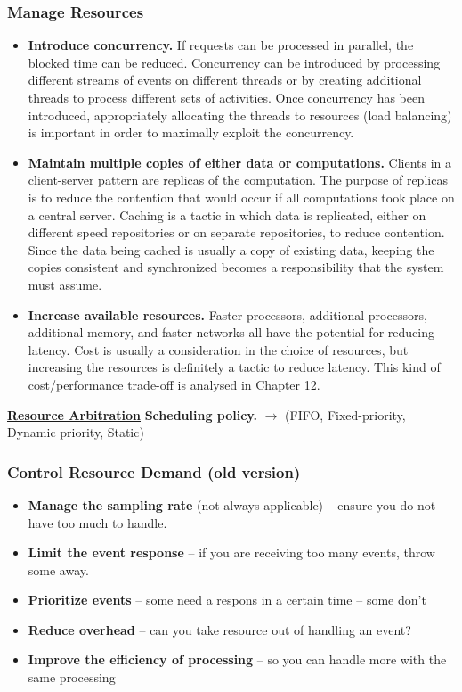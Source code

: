 \documentclass[a4paper]{article}
\begin{document}
\subsubsection{Manage Resources}
\begin{itemize}
  \item
    \textbf{Introduce concurrency.}
    If requests can be processed in parallel, the blocked time can be reduced.
    Concurrency can be introduced by processing different streams of
    events on different threads or by creating additional threads
    to process different sets of activities.
    Once concurrency has been introduced, appropriately allocating
    the threads to resources (load balancing) is important in
    order to maximally exploit the concurrency.
  \item
    \textbf{Maintain multiple copies of either data or computations.}
    Clients in a client-server pattern are replicas of the computation.
    The purpose of replicas is to reduce the contention that would occur
    if all computations took place on a central server.
    Caching is a tactic in which data is replicated,
    either on different speed repositories or on separate repositories,
    to reduce contention.
    Since the data being cached is usually a copy of existing data,
    keeping the copies consistent and synchronized becomes a
    responsibility that the system must assume.
  \item
    \textbf{Increase available resources.}
    Faster processors, additional processors, additional memory,
    and faster networks all have the potential for reducing latency.
    Cost is usually a consideration in the choice of resources,
    but increasing the resources is definitely a tactic to reduce latency.
    This kind of cost/performance trade-off is analysed in Chapter 12.
\end{itemize}

\underline{\textbf{Resource Arbitration}}
\textbf{Scheduling policy.} $\rightarrow$ (FIFO, Fixed-priority, Dynamic priority, Static)

\subsubsection{Control Resource Demand (old version)}
\begin{itemize}
\item{\textbf{Manage the sampling rate} (not always applicable) – ensure you do not have too much to handle.}
\item{\textbf{Limit the event response} – if you are receiving too many events, throw some away.}
\item{\textbf{Prioritize events} – some need a respons in a certain time – some don’t}
\item{\textbf{Reduce overhead} – can you take resource out of handling an event?}
\item{\textbf{Improve the efficiency of processing} – so you can handle more with the same processing}
\end{itemize}
\end{document}
